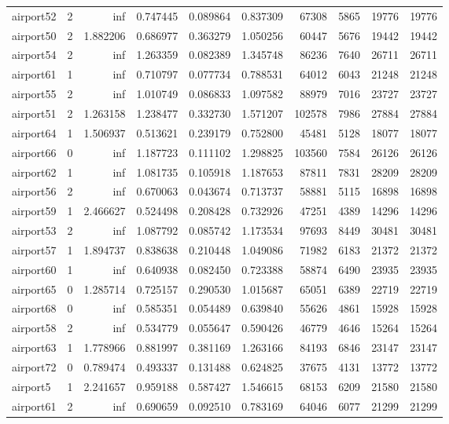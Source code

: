 \begin{longtable}{|l|r|r|r|r|r|r|r|r|r|}
airport52 & 2 & inf & 0.747445 & 0.089864 & 0.837309 & 67308 & 5865 & 19776 & 19776 \\
airport50 & 2 & 1.882206 & 0.686977 & 0.363279 & 1.050256 & 60447 & 5676 & 19442 & 19442 \\
airport54 & 2 & inf & 1.263359 & 0.082389 & 1.345748 & 86236 & 7640 & 26711 & 26711 \\
airport61 & 1 & inf & 0.710797 & 0.077734 & 0.788531 & 64012 & 6043 & 21248 & 21248 \\
airport55 & 2 & inf & 1.010749 & 0.086833 & 1.097582 & 88979 & 7016 & 23727 & 23727 \\
airport51 & 2 & 1.263158 & 1.238477 & 0.332730 & 1.571207 & 102578 & 7986 & 27884 & 27884 \\
airport64 & 1 & 1.506937 & 0.513621 & 0.239179 & 0.752800 & 45481 & 5128 & 18077 & 18077 \\
airport66 & 0 & inf & 1.187723 & 0.111102 & 1.298825 & 103560 & 7584 & 26126 & 26126 \\
airport62 & 1 & inf & 1.081735 & 0.105918 & 1.187653 & 87811 & 7831 & 28209 & 28209 \\
airport56 & 2 & inf & 0.670063 & 0.043674 & 0.713737 & 58881 & 5115 & 16898 & 16898 \\
airport59 & 1 & 2.466627 & 0.524498 & 0.208428 & 0.732926 & 47251 & 4389 & 14296 & 14296 \\
airport53 & 2 & inf & 1.087792 & 0.085742 & 1.173534 & 97693 & 8449 & 30481 & 30481 \\
airport57 & 1 & 1.894737 & 0.838638 & 0.210448 & 1.049086 & 71982 & 6183 & 21372 & 21372 \\
airport60 & 1 & inf & 0.640938 & 0.082450 & 0.723388 & 58874 & 6490 & 23935 & 23935 \\
airport65 & 0 & 1.285714 & 0.725157 & 0.290530 & 1.015687 & 65051 & 6389 & 22719 & 22719 \\
airport68 & 0 & inf & 0.585351 & 0.054489 & 0.639840 & 55626 & 4861 & 15928 & 15928 \\
airport58 & 2 & inf & 0.534779 & 0.055647 & 0.590426 & 46779 & 4646 & 15264 & 15264 \\
airport63 & 1 & 1.778966 & 0.881997 & 0.381169 & 1.263166 & 84193 & 6846 & 23147 & 23147 \\
airport72 & 0 & 0.789474 & 0.493337 & 0.131488 & 0.624825 & 37675 & 4131 & 13772 & 13772 \\
airport5 & 1 & 2.241657 & 0.959188 & 0.587427 & 1.546615 & 68153 & 6209 & 21580 & 21580 \\
airport61 & 2 & inf & 0.690659 & 0.092510 & 0.783169 & 64046 & 6077 & 21299 & 21299 \\

\end{longtable}
